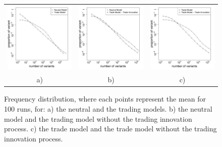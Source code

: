 \documentclass{wscpaperproc}
\begin{document}
\begin{figure}[!h]
	\begin{center}
		\begin{tabular}{ccc}
		\includegraphics[width=5.2cm]{img/2SetupDistribA.pdf} &
		\includegraphics[width=5.2cm]{img/2SetupDistribB.pdf} &
		\includegraphics[width=5.2cm]{img/2SetupDistribD.pdf} \\
		a) & b) & c)  \\
		\end{tabular}

	\end{center}
	\caption{Frequency distribution, where each points represent the mean for 100 runs, for: a) the neutral and the trading models.  b) the neutral model and the trading model without the trading innovation process. c) the trade model and the trade model without the trading innovation process.}
	\label{fig:2setDi}
\end{figure}
\end{document}
